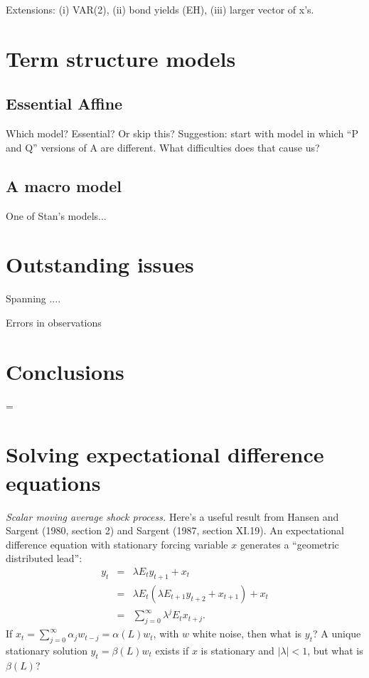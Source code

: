 \documentclass[11pt]{article}
\begin{document}
{Extensions:
(i) VAR(2), (ii) bond yields (EH), (iii) larger vector of x's.


\section{Term structure models}


\subsection{Essential Affine}

Which model?  Essential?  Or skip this?
Suggestion:  start with model in which ``P and Q'' versions of A are different.
What difficulties does that cause us?


\subsection{A macro model}

One of Stan's models...


\section{Outstanding issues}

Spanning ....

Errors in observations



\section{Conclusions}


\pagebreak
\baselineskip=\oldbaselineskip
\appendix
\section{Solving expectational difference equations}
\label{app:hs-formulas}

{\it Scalar moving average shock process.\/}
Here's a useful result from Hansen and Sargent (1980, section 2)
and Sargent (1987, section XI.19).
An expectational difference equation with stationary forcing
variable $x$ generates a
``geometric distributed lead'':
\begin{eqnarray*}
    y_t &=&    \lambda E_t y_{t+1} + x_t  \\
        &=&  \lambda E_t (\lambda  E_{t+1} y_{t+2} + x_{t+1}) +  x_t \\
        &=&  \sum_{j=0}^\infty \lambda^j  E_t x_{t+j} .
\end{eqnarray*}
If $ x_t = \sum_{j=0}^\infty \alpha_j w_{t-j} = \alpha(L) w_t $,
with $w$ white noise, then what is $y_t$?
A unique stationary solution $ y_t = \beta(L) w_t $
exists if $x$ is stationary and $ |\lambda|<1 $,
but what is $\beta(L)$?

}
\end{document}
